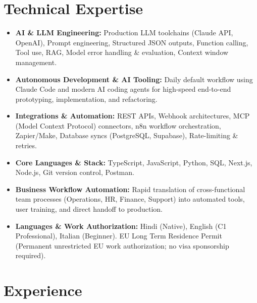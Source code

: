 \documentclass[10pt,a4paper]{article}
\begin{document}
\section{Technical Expertise}
\begin{itemize}
  \item \textbf{AI \& LLM Engineering:} Production LLM toolchains (Claude API, OpenAI), Prompt engineering, Structured JSON outputs, Function calling, Tool use, RAG, Model error handling \& evaluation, Context window management.
  \item \textbf{Autonomous Development \& AI Tooling:} Daily default workflow using Claude Code and modern AI coding agents for high-speed end-to-end prototyping, implementation, and refactoring.
  \item \textbf{Integrations \& Automation:} REST APIs, Webhook architectures, MCP (Model Context Protocol) connectors, n8n workflow orchestration, Zapier/Make, Database syncs (PostgreSQL, Supabase), Rate-limiting \& retries.
  \item \textbf{Core Languages \& Stack:} TypeScript, JavaScript, Python, SQL, Next.js, Node.js, Git version control, Postman.
  \item \textbf{Business Workflow Automation:} Rapid translation of cross-functional team processes (Operations, HR, Finance, Support) into automated tools, user training, and direct handoff to production.
  \item \textbf{Languages \& Work Authorization:} Hindi (Native), English (C1 Professional), Italian (Beginner). EU Long Term Residence Permit (Permanent unrestricted EU work authorization; no visa sponsorship required).
\end{itemize}

\section{Experience}
\end{document}
